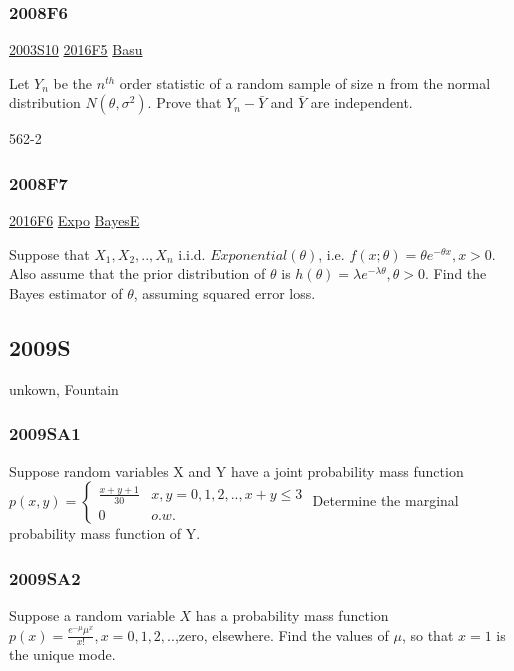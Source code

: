 \documentclass[10pt,twocolumn,portrait]{article}
\begin{document}
\hypertarget{f6-3}{%
\subsubsection{2008F6}\label{f6-3}}

\protect\hyperlink{s10}{2003S10} \protect\hyperlink{f5-6}{2016F5}
\protect\hyperlink{Basu}{Basu}

Let \(Y_n\) be the \(n^{th}\) order statistic of a random sample of size
n from the normal distribution \(N(\theta,\sigma^2)\). Prove that
\(Y_n-\bar Y\) and \(\bar Y\) are independent.

562-2

\hypertarget{f7-3}{%
\subsubsection{2008F7}\label{f7-3}}

\protect\hyperlink{f6-5}{2016F6} \protect\hyperlink{Expo}{Expo}
\protect\hyperlink{BayesE}{BayesE}

Suppose that \(X_1,X_2,..,X_n\) i.i.d. \(Exponential(\theta)\), i.e.
\(f(x;\theta)=\theta e^{-\theta x},x>0\). Also assume that the prior
distribution of \(\theta\) is
\(h(\theta)=\lambda e^{-\lambda\theta},\theta>0\). Find the Bayes
estimator of \(\theta\), assuming squared error loss.

\hypertarget{s-3}{%
\subsection{2009S}\label{s-3}}

unkown, Fountain

\hypertarget{sa1}{%
\subsubsection{2009SA1}\label{sa1}}

Suppose random variables X and Y have a joint probability mass function
\(p(x,y)=\begin{cases}\frac{x+y+1}{30}& x,y=0,1,2,..,x+y\le3\\0& o.w.\end{cases}\)
Determine the marginal probability mass function of Y.

\hypertarget{sa2}{%
\subsubsection{2009SA2}\label{sa2}}

Suppose a random variable \(X\) has a probability mass function
\(p(x)=\frac{e^{-\mu}\mu^x}{x!},x=0,1,2,..\),zero, elsewhere. Find the
values of \(\mu\), so that \(x=1\) is the unique mode.
\end{document}
